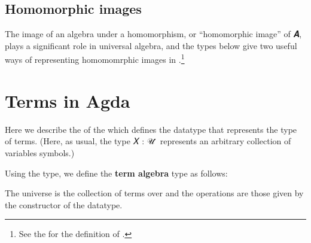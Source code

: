 \documentclass[a4paper,USenglish,cleveref,autoref,thm-restate]{lipics-v2019}
\begin{document}
\subsection{Homomorphic images}\label{sec:homomorphic-images}
The image of an algebra  under a homomorphism, or ``homomorphic image'' of \AgdaBound 𝑨, plays a significant role in universal algebra, and the types below give two useful ways of representing homomomrphic images in \agda.\footnote{See the \preludemodule for the definition of \AgdaSpace{}.}
\begin{code}\end{code}

\section{Terms in Agda}\label{sec:terms-in-agda}
Here we describe the \termsmodule of the \agdaualib which defines the  datatype that represents the type of terms. (Here, as usual, the type \ab 𝑋 : \ab 𝒰 ̇ represents an arbitrary collection of variables symbols.)\\[-5mm]
\begin{code}\end{code}
Using the  type, we define the \textbf{term algebra} type as follows:
\begin{code}\end{code}
The universe is the collection of terms over  and the operations are those given by the  constructor of the  datatype.
\end{document}

